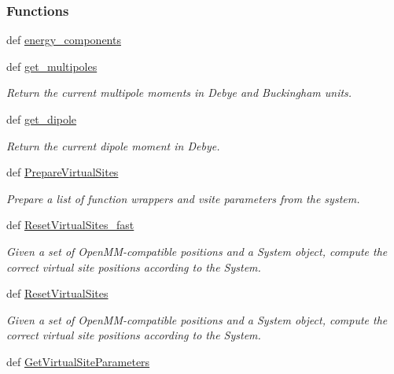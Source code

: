 \subsubsection*{Functions}
\begin{DoxyCompactItemize}
\item 
def \hyperlink{namespaceforcebalance_1_1openmmio_a0266102cb0a6907750a62e6948299255}{energy\-\_\-components}
\item 
def \hyperlink{namespaceforcebalance_1_1openmmio_a829487387c4b4a4817a2e3fc50242857}{get\-\_\-multipoles}
\begin{DoxyCompactList}\small\item\em Return the current multipole moments in Debye and Buckingham units. \end{DoxyCompactList}\item 
def \hyperlink{namespaceforcebalance_1_1openmmio_a8a2081dcaf027b9b9ab224e22680714d}{get\-\_\-dipole}
\begin{DoxyCompactList}\small\item\em Return the current dipole moment in Debye. \end{DoxyCompactList}\item 
def \hyperlink{namespaceforcebalance_1_1openmmio_ac7c1f986acada081a7c24a5d77701a35}{Prepare\-Virtual\-Sites}
\begin{DoxyCompactList}\small\item\em Prepare a list of function wrappers and vsite parameters from the system. \end{DoxyCompactList}\item 
def \hyperlink{namespaceforcebalance_1_1openmmio_a1f92d88085657ca5726f8925bfa68f6f}{Reset\-Virtual\-Sites\-\_\-fast}
\begin{DoxyCompactList}\small\item\em Given a set of Open\-M\-M-\/compatible positions and a System object, compute the correct virtual site positions according to the System. \end{DoxyCompactList}\item 
def \hyperlink{namespaceforcebalance_1_1openmmio_af623fa5af97de6c6a0bc5f98ce8db432}{Reset\-Virtual\-Sites}
\begin{DoxyCompactList}\small\item\em Given a set of Open\-M\-M-\/compatible positions and a System object, compute the correct virtual site positions according to the System. \end{DoxyCompactList}\item 
def \hyperlink{namespaceforcebalance_1_1openmmio_a71e9c5b9d6a71839f5e04cd7ad7351db}{Get\-Virtual\-Site\-Parameters}

\end{DoxyCompactItemize}
